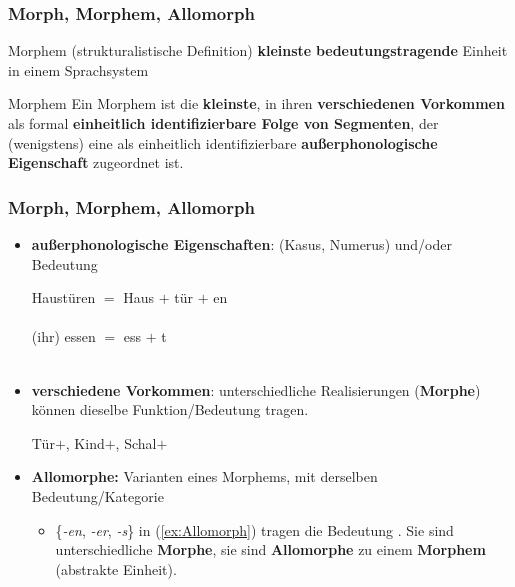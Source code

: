 \begin{frame}
\frametitle{Morph, Morphem, Allomorph}

\begin{block}{Morphem (strukturalistische Definition)}
	\textbf{kleinste} \textbf{bedeutungstragende} Einheit in einem Sprachsystem
\end{block}

\pause

\begin{block}{Morphem \citep[38]{Wurzel84x}}
	Ein Morphem ist die \textbf{kleinste}, in ihren \textbf{verschiedenen Vorkommen} als formal \textbf{einheitlich identifizierbare Folge von Segmenten}, der (wenigstens) eine als einheitlich identifizierbare \textbf{außerphonologische Eigenschaft} zugeordnet ist.
\end{block}

\end{frame}


\begin{frame}
\frametitle{Morph, Morphem, Allomorph}

\begin{itemize}
	\item \textbf{außerphonologische Eigenschaften}:  (\zB Kasus, Numerus) und/oder  Bedeutung
	
	\ea
		\ea
%		
		\gll Haustüren $=$ Haus $+$ tür $+$ en \\
		{} {}  {}  {}  \\
		
		\ex	
		\gll (ihr) essen $=$ ess $+$ t \\
		{} {} {}  {} \\
		
		\z
	\z 

\pause 
	
	\item \textbf{verschiedene Vorkommen}: unterschiedliche Realisierungen (\textbf{Morphe}) können dieselbe Funktion/Bedeutung tragen.
	
	\ea\label{ex:Allomorph} Tür$+$, Kind$+$, Schal$+$
	\z

\pause 
	
	\item \textbf{Allomorphe:} Varianten eines Morphems, mit derselben Bedeutung/Kategorie
	
	\begin{itemize}
		\item \{\emph{-en}, \emph{-er}, \emph{-s}\} in (\ref{ex:Allomorph}) tragen die Bedeutung . Sie sind unterschiedliche \textbf{Morphe}, sie sind \textbf{Allomorphe} zu einem \textbf{Morphem} (abstrakte Einheit).
	\end{itemize}

\end{itemize}
\end{frame}


